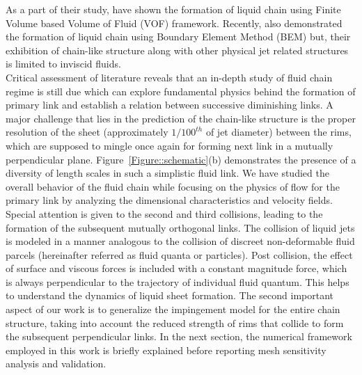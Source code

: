 \documentclass[%
 aip,
 sd,%
amsmath,amssymb,
preprint,%
author-year,%
]{revtex4-1}
\begin{document}
As a part of their study, \cite{chen2013high} have shown the formation of liquid chain using Finite Volume based Volume of Fluid (VOF) framework. Recently, \cite{da2016surface} also demonstrated the formation of liquid chain using Boundary Element Method (BEM) but, their exhibition of chain-like structure along with other physical jet related structures is limited to inviscid fluids.\\
Critical assessment of literature reveals that an in-depth study of fluid chain regime is still due which can explore fundamental physics behind the formation of primary link and establish a relation between successive diminishing links. A major challenge that lies in the prediction of the chain-like structure is the proper resolution of the sheet (approximately $1/100^{th}$ of jet diameter) between the rims, which are supposed to mingle once again for forming next link in a mutually perpendicular plane. Figure~\ref{Figure::schematic}(b) demonstrates the presence of a diversity of length scales in such a simplistic fluid link. We have studied the overall behavior of the fluid chain while focusing on the physics of flow for the primary link by analyzing the dimensional characteristics and velocity fields. Special attention is given to the second and third collisions, leading to the formation of the subsequent mutually orthogonal links. The collision of liquid jets is modeled in a manner analogous to the collision of discreet non-deformable fluid parcels (hereinafter referred as fluid quanta or particles). Post collision, the effect of surface and viscous forces {\color{red}is} included with a constant magnitude force{\color{red}, which is} always perpendicular to the trajectory of individual fluid quantum. This helps {\color{red}to} understand the dynamics of liquid sheet formation. The second important aspect of our work is to generalize the impingement model for the entire chain structure, taking into account the reduced strength of rims that collide to form the subsequent perpendicular links. In the next section, the numerical framework employed in this work is briefly explained before reporting mesh sensitivity analysis and validation.
\end{document}
